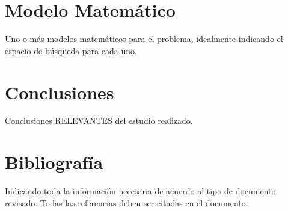 \documentclass[letter, 11pt]{article}
\begin{document}
\section{Modelo Matem\'atico}
Uno o m\'as modelos matem\'aticos para el problema, idealmente indicando el espacio de b\'usqueda para cada uno.

\section{Conclusiones}
Conclusiones RELEVANTES del estudio realizado.

\section{Bibliograf\'ia}
Indicando toda la informaci\'on necesaria de acuerdo al tipo de documento revisado. Todas las referencias deben ser 
citadas en el documento.


\end{document}
